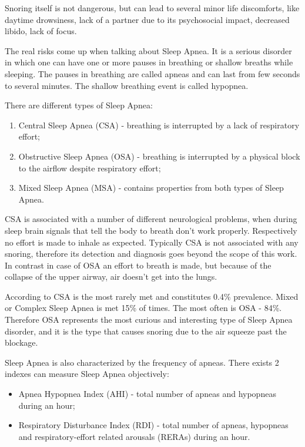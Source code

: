 Snoring itself is not dangerous, but can lead to several minor life discomforts, like daytime drowsiness, lack of a partner due to its psychosocial impact, decreased libido, lack of focus.

The real risks come up when talking about Sleep Apnea. It is a serious disorder in which one can have one or more pauses in breathing or shallow breaths while sleeping. The pauses in breathing are called apneas and can last from few seconds to several minutes. The shallow breathing event is called hypopnea. 

There are different types of Sleep Apnea:
\begin{enumerate}[topsep=5pt, partopsep=0pt,itemsep=3pt,parsep=1pt]
 \item Central Sleep Apnea (CSA) - breathing is interrupted by a lack of respiratory effort;
 \item Obstructive Sleep Apnea (OSA) - breathing is interrupted by a physical block to the airflow despite respiratory effort;
 \item Mixed Sleep Apnea (MSA) - contains properties from both types of Sleep Apnea.
\end{enumerate}

CSA is associated with a number of different neurological problems, when during sleep brain signals that tell the body to breath don't work properly. Respectively no effort is made to inhale as expected. Typically CSA is not associated with any snoring, therefore its detection and diagnosis goes beyond the scope of this work. In contrast in case of OSA an effort to breath is made, but because of the collapse of the upper airway, air doesn't get into the lungs.

According to \cite{CSA} CSA is the most rarely met and constitutes 0.4\% prevalence. Mixed or Complex Sleep Apnea is met 15\% of times. The most often is OSA - 84\%. Therefore OSA represents the most curious and interesting type of Sleep Apnea disorder, and it is the type that causes snoring due to the air squeeze past the blockage. 

Sleep Apnea is also characterized by the frequency of apneas. There exists 2 indexes can measure Sleep Apnea objectively: 
\begin{itemize}[topsep=5pt, partopsep=0pt,itemsep=3pt,parsep=1pt]
 \item Apnea Hypopnea Index (AHI) - total number of apneas and hypopneas during an hour;
 \item Respiratory Disturbance Index (RDI) - total number of apneas, hypopneas and respiratory-effort related arousals (RERAs) during an hour.
\end{itemize}

